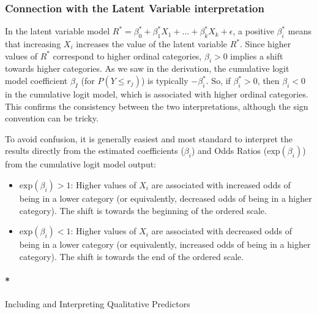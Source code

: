 \documentclass[
  letterpaper,
  DIV=11,
  numbers=noendperiod]{scrartcl}
\let\oldparagraph\paragraph
\renewcommand{\paragraph}[1]{\oldparagraph{#1}\mbox{}}
\begin{document}
\hypertarget{connection-with-the-latent-variable-interpretation}{%
\subsubsection*{Connection with the Latent Variable
interpretation}\label{connection-with-the-latent-variable-interpretation}}

In the latent variable model
\(R^* = \beta_0^* + \beta_1^*X_1 + \dots + \beta_k^*X_k + \epsilon\), a
positive \(\beta_i^*\) means that increasing \(X_i\) increases the value
of the latent variable \(R^*\). Since higher values of \(R^*\)
correspond to higher ordinal categories, \(\beta_i>0\) implies a shift
towards higher categories. As we saw in the derivation, the cumulative
logit model coefficient \(\beta_I\) (for \(P(Y \leq r_j)\)) is typically
\(-\beta_i^*\). So, if \(\beta_i^*>0\), then \(\beta_i<0\) in the
cumulative logit model, which is associated with higher ordinal
categories. This confirms the consistency between the two
interpretations, although the sign convention can be tricky.

To avoid confusion, it is generally easiest and most standard to
interpret the results directly from the estimated coefficients
(\(\beta_i\)) and Odds Ratios (\(\text{exp}(\beta_i)\)) from the
cumulative logit model output:

\begin{itemize}
\item
  \(\text{exp}(\beta_i)>1\): Higher values of \(X_i\) are associated
  with increased odds of being in a lower category (or equivalently,
  decreased odds of being in a higher category). The shift is towards
  the beginning of the ordered scale.
\item
  \(\text{exp}(\beta_i)<1\): Higher values of \(X_i\) are associated
  with decreased odds of being in a lower category (or equivalently,
  increased odds of being in a higher category). The shift is towards
  the end of the ordered scale.
\end{itemize}

\hypertarget{including-and-interpreting-qualitative-predictors}{%
\paragraph*{Including and Interpreting Qualitative
Predictors}\label{including-and-interpreting-qualitative-predictors}}
\end{document}
